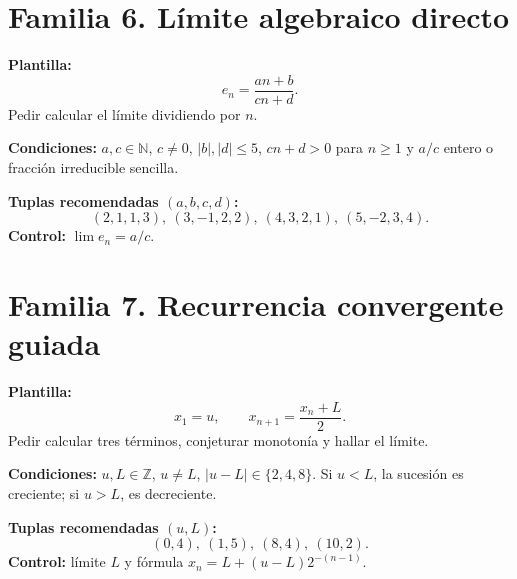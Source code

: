 \documentclass[12pt,letterpaper]{article}
\newcommand{\familia}[2]{\section*{Familia #1. #2}}
\newcommand{\campo}[1]{\textcolor{azul}{\textbf{#1}}}
\begin{document}
\familia{6}{Límite algebraico directo}
\campo{Plantilla:}
\[
 e_n=\frac{an+b}{cn+d}.
\]
Pedir calcular el límite dividiendo por $n$.\par
\campo{Condiciones:} $a,c\in\mathbb N$, $c\neq0$, $|b|,|d|\leq5$,
$cn+d>0$ para $n\geq1$ y $a/c$ entero o fracción irreducible sencilla.\par
\campo{Tuplas recomendadas $(a,b,c,d)$:}
\[
 (2,1,1,3),\ (3,-1,2,2),\ (4,3,2,1),\ (5,-2,3,4).
\]
\campo{Control:} $\displaystyle\lim e_n=a/c$.

\familia{7}{Recurrencia convergente guiada}
\campo{Plantilla:}
\[
 x_1=u,\qquad x_{n+1}=\frac{x_n+L}{2}.
\]
Pedir calcular tres términos, conjeturar monotonía y hallar el límite.\par
\campo{Condiciones:} $u,L\in\mathbb Z$, $u\neq L$, $|u-L|\in\{2,4,8\}$.
Si $u<L$, la sucesión es creciente; si $u>L$, es decreciente.\par
\campo{Tuplas recomendadas $(u,L)$:}
\[
 (0,4),\ (1,5),\ (8,4),\ (10,2).
\]
\campo{Control:} límite $L$ y fórmula
$x_n=L+(u-L)2^{-(n-1)}$.
\end{document}
